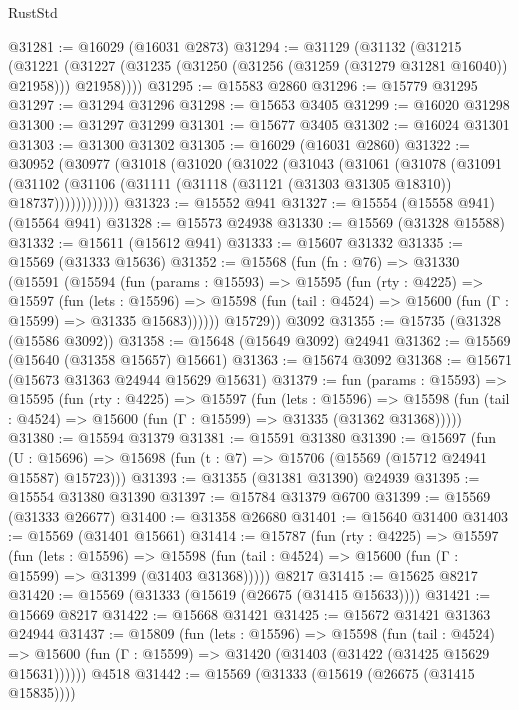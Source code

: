 \begin{lexlean}{RustStd}
\begin{coremodule}
@31281 := @16029 (@16031 @2873)
@31294 := @31129
    (@31132
      (@31215
        (@31221 (@31227 (@31235 (@31250 (@31256 (@31259 (@31279 @31281 @16040)) @21958))) @21958))))
@31295 := @15583 @2860
@31296 := @15779 @31295
@31297 := @31294 @31296
@31298 := @15653 @3405
@31299 := @16020 @31298
@31300 := @31297 @31299
@31301 := @15677 @3405
@31302 := @16024 @31301
@31303 := @31300 @31302
@31305 := @16029 (@16031 @2860)
@31322 := @30952
    (@30977
      (@31018
        (@31020
          (@31022
            (@31043
              (@31061
                (@31078
                  (@31091
                    (@31102
                      (@31106 (@31111 (@31118 (@31121 (@31303 @31305 @18310)) @18737))))))))))))
@31323 := @15552 @941
@31327 := @15554 (@15558 @941) (@15564 @941)
@31328 := @15573 @24938
@31330 := @15569 (@31328 @15588)
@31332 := @15611 (@15612 @941)
@31333 := @15607 @31332
@31335 := @15569 (@31333 @15636)
@31352 := @15568
    (fun (fn : @76) =>
    @31330
      (@15591
        (@15594
          (fun (params : @15593) =>
          @15595
            (fun (rty : @4225) =>
            @15597
              (fun (lets : @15596) =>
              @15598 (fun (tail : @4524) => @15600 (fun (Γ : @15599) => @31335 @15683))))))
        @15729))
    @3092
@31355 := @15735 (@31328 (@15586 @3092))
@31358 := @15648 (@15649 @3092) @24941
@31362 := @15569 (@15640 (@31358 @15657) @15661)
@31363 := @15674 @3092
@31368 := @15671 (@15673 @31363 @24944 @15629 @15631)
@31379 := fun (params : @15593) =>
  @15595
    (fun (rty : @4225) =>
    @15597
      (fun (lets : @15596) =>
      @15598 (fun (tail : @4524) => @15600 (fun (Γ : @15599) => @31335 (@31362 @31368)))))
@31380 := @15594 @31379
@31381 := @15591 @31380
@31390 := @15697
    (fun (U : @15696) => @15698 (fun (t : @7) => @15706 (@15569 (@15712 @24941 @15587) @15723)))
@31393 := @31355 (@31381 @31390) @24939
@31395 := @15554 @31380 @31390
@31397 := @15784 @31379 @6700
@31399 := @15569 (@31333 @26677)
@31400 := @31358 @26680
@31401 := @15640 @31400
@31403 := @15569 (@31401 @15661)
@31414 := @15787
    (fun (rty : @4225) =>
    @15597
      (fun (lets : @15596) =>
      @15598 (fun (tail : @4524) => @15600 (fun (Γ : @15599) => @31399 (@31403 @31368)))))
    @8217
@31415 := @15625 @8217
@31420 := @15569 (@31333 (@15619 (@26675 (@31415 @15633))))
@31421 := @15669 @8217
@31422 := @15668 @31421
@31425 := @15672 @31421 @31363 @24944
@31437 := @15809
    (fun (lets : @15596) =>
    @15598
      (fun (tail : @4524) =>
      @15600 (fun (Γ : @15599) => @31420 (@31403 (@31422 (@31425 @15629 @15631))))))
    @4518
@31442 := @15569 (@31333 (@15619 (@26675 (@31415 @15835))))

\end{coremodule}
\end{lexlean}
